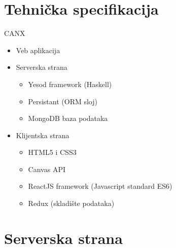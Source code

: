 \documentclass{beamer}
\begin{document}
\section{Tehnička specifikacija}
\begin{frame}{CANX}
    \begin{itemize}
        \item Veb aplikacija
        \item Serverska strana
        	\begin{itemize}
        	 	\item Yesod framework (Haskell)
        	 	\item Persistant (ORM sloj)
        	 	\item MongoDB baza podataka
        	\end{itemize}
        	
        \item Klijentska strana
        	\begin{itemize}
        	 	\item HTML5 i CSS3
        	 	\item Canvas API
        	 	\item ReactJS framework (Javascript standard ES6)
        	 	\item Redux (skladište podataka)
        	\end{itemize}	
    \end{itemize}
\end{frame}


\section{Serverska strana}
\begin{frame}{}

\end{frame}

\end{document}
